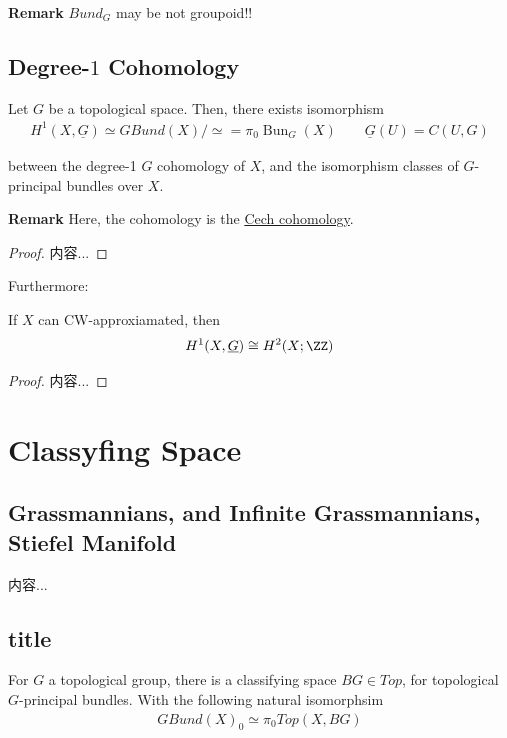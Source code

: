 \documentclass[Total.tex]{subfiles}
\begin{document}
				\textbf{Remark} $Bund_G$ may be not groupoid!!
				
			
			\subsection{Degree-$1$ Cohomology}
			\begin{proposition}
				Let $G$ be a topological space. Then, there exists isomorphism
				\begin{gather*}
					H^1(X,\underline{G})\simeq GBund(X)/\simeq=\pi_0 \operatorname{Bun}_G(X)\qquad \underline{G}(U)=C(U,G)
				\end{gather*}
				
				between the degree-1 $G$ cohomology of $X$, and the isomorphism classes of $G$-principal bundles over $X$. 
				
				\textbf{Remark} Here, the cohomology is the \underline{Cech cohomology}.
			\end{proposition} 
			\begin{proof}
				内容...
			\end{proof}
			
			Furthermore:
			\begin{proposition}
				If $X$ can CW-approxiamated, then
				\begin{gather*}
					H^1(X,\underline{G})\cong  H^2(X;\ZZ)
				\end{gather*}
			\end{proposition}
			\begin{proof}
				内容...
			\end{proof}
		\section{Classyfing Space}
			\subsection{Grassmannians, and Infinite Grassmannians, Stiefel Manifold}
				\begin{Def}
					内容...
				\end{Def}
			
			\subsection{title}
				\begin{Def}
					For $G$ a topological group, there is a classifying space $BG\in Top$, for topological $G$-principal bundles. With the following natural isomorphsim
					\begin{gather*}
						GBund(X)_0\simeq \pi_0 Top(X,BG)
					\end{gather*}
				\end{Def}
			
\end{document}
